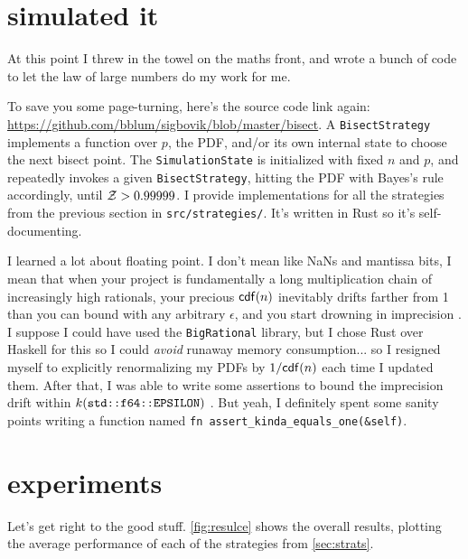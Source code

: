 \documentclass[11pt]{sigplanconf}
\begin{document}
\section{simulated it}

At this point I threw in the towel on the maths front,
and wrote a bunch of code to let the law of large numbers do my work for me.

To save you some page-turning, here's the source code link again:
\url{https://github.com/bblum/sigbovik/blob/master/bisect}.
A {\tt BisectStrategy}
implements a function over $p$, the PDF, and/or its own internal state
to choose the next bisect point.
The {\tt SimulationState} is initialized with fixed $n$ and $p$,
and repeatedly invokes a given {\tt BisectStrategy},
hitting the PDF with Bayes's rule accordingly,
until $\mathcal{Z} > 0.99999$.
I provide implementations for all the strategies from the previous section in {\tt src/strategies/}.
It's written in Rust so it's self-documenting.

I learned a lot about floating point.
I don't mean like NaNs and mantissa bits,
I mean that when your project is fundamentally a long multiplication chain of increasingly high rationals,
your precious $\mathsf{cdf}(n)$ inevitably drifts farther from 1 than you can bound with any arbitrary $\epsilon$, and you start drowning in imprecision \cite{drowningpoint}.
I suppose I could have used the {\tt BigRational} library,
but I chose Rust over Haskell for this so I could {\it avoid} runaway memory consumption...
so I resigned myself to explicitly renormalizing my PDFs by $1/\mathsf{cdf}(n)$ each time I updated them.
After that, I was able to write some assertions
to bound the imprecision drift within $k(\text{\tt std::f64::EPSILON})$ \cite{epsilon}.
But yeah, I definitely spent some sanity points writing a function named {\tt fn assert\_kinda\_equals\_one(\&self)}.



\section{experiments}

Let's get right to the good stuff.
\cref{fig:resulce} shows the overall results,
plotting the average performance of each of the strategies from \cref{sec:strats}.
\end{document}
